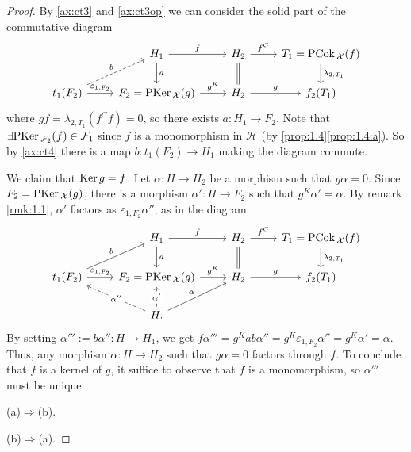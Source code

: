 \begin{proof}
By \ref{ax:ct3} and \ref{ax:ct3op} we can consider the solid part of the commutative diagram
\begin{equation*}
\begin{tikzcd}
 & H_1\arrow{r}{f}\arrow{d}{a} & H_2\arrow{r}{f^C}\arrow[equal]{d} & T_1 = \PCok_\mathcal{X}(f)\arrow{d}{\lambda_{2,T_1}}\\
t_1(F_2)\arrow[dashed]{ur}{b}\arrow{r}{\varepsilon_{1,F_2}} & F_2=\PKer_\mathcal{X}(g)\arrow{r}{g^K} & H_2\arrow{r}{g} & f_2(T_1)
\end{tikzcd}
\end{equation*}
where $gf = \lambda_{2,T_1}(f^C f)=0$, so there exists $a:H_1\to F_2$. Note that $\exists \mathrm{\textup{PKer\,}}_{\mathcal{F}_2}(f)\in\mathcal{F}_1$ since $f$ is a monomorphism in $\mathcal{H}$ (by \cref{prop:1.4}\ref{prop:1.4:a}). So by \ref{ax:ct4}  there is a map $b:t_1(F_2)\to H_1$ making the diagram commute.

We claim that $\mathrm{\textup{Ker\,}} g = f$. Let $\alpha:H\to H_2$ be a morphism such that $g\alpha =0$. Since $F_2 = \mathrm{\textup{PKer\,}}_\mathcal{X}(g)$, there is a morphism $\alpha':H\to F_2$ such that $g^K\alpha'=\alpha$. By remark \ref{rmk:1.1}, $\alpha'$ factors as $\varepsilon_{1,F_2}\alpha''$, as in the diagram:
\begin{equation*}
\begin{tikzcd}
& H_1\arrow{r}{f}\arrow{d}{a} & H_2\arrow{r}{f^C}\arrow[equal]{d}& T_1 = \PCok_\mathcal{X}(f)\arrow{d}{\lambda_{2,T_1}}\\
t_1(F_2)\arrow{ur}{b}\arrow{r}{\varepsilon_{1,F_2}} & F_2=\PKer_\mathcal{X}(g)\arrow{r}{g^K} & H_2\arrow{r}{g} & f_2(T_1)\\
& H.\arrow{ur}{\alpha}\arrow[dashed]{u}[description]{\alpha'}\arrow[dashed]{ul}[description]{\alpha''} & &
\end{tikzcd}
\end{equation*}
By setting $\alpha''' := b\alpha'':H\to H_1$, we get $f\alpha''' = g^K ab\alpha'' = g^K\varepsilon_{1,F_2}\alpha''=g^K\alpha' = \alpha$. Thus, any morphism $\alpha:H \to H_2$ such that $g\alpha =0$ factors through $f$. To conclude that $f$ is a kernel of $g$, it suffice to observe that $f$ is a monomorphism, so $\alpha'''$ must be unique.

\smallskip\noindent
(a)$\Rightarrow$(b).

\smallskip\noindent
(b)$\Rightarrow$(a).
\end{proof}





